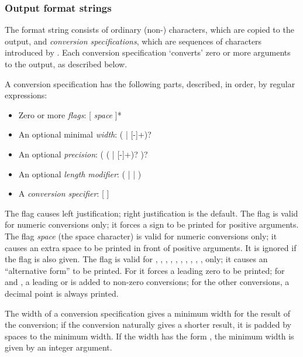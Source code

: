 \subsubsection*{Output format strings}

The format string consists of ordinary (non-\code{\%}) characters, which
are copied to the output, and \emph{conversion specifications}, which
are sequences of characters introduced by \code{\%}.  Each conversion
specification `converts' zero or more arguments to the output, as
described below.

A conversion specification has the following parts, described, in order,
by regular expressions:
\begin{itemize}
\item Zero or more \emph{flags}:
[\code{-} \code{+} \emph{space} \code{\#} ]*
\item An optional minimal \emph{width}:
(\code{*} | [-]+)?
\item An optional \emph{precision}:
( (\code{*} | [-]+)? )?
\item An optional \emph{length modifier}:
( |  |  )
\item A \emph{conversion specifier}:
[                 \code{\%}]
\end{itemize}

The flag \code{-} causes left justification; right justification is the
default.  The flag \code{+} is valid for numeric conversions only; it
forces a \code{+} sign to be printed for positive arguments.  The flag
\emph{space} (the space character) is valid for numeric conversions only;
it causes an extra space to be printed in front of positive arguments.
It is ignored if the \code{+} flag is also given.
The flag \code{\#} is valid for , , , ,
, , , , , , 
only; it causes an ``alternative form'' to be printed.  For  it
forces a leading zero to be printed; for  and , a
leading  or  is added to non-zero conversions; for the
other conversions, a decimal point is always printed.

The width of a conversion specification gives a minimum width for the
result of the conversion; if the conversion naturally gives a shorter
result, it is padded by spaces to the minimum width.  If the width has
the form \code{*}, the minimum width is given by an integer argument.

